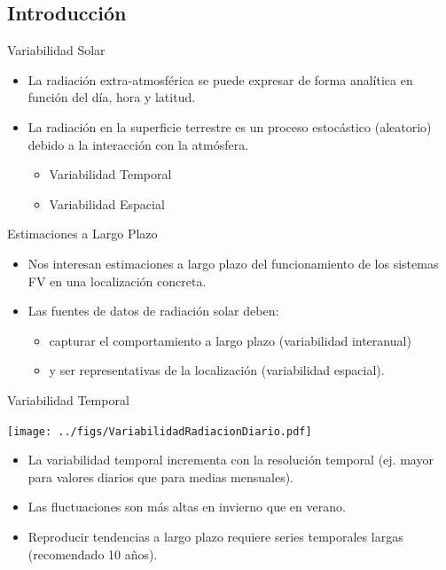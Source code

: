 \documentclass[xcolor={usenames,svgnames,dvipsnames}]{beamer}
\begin{document}
\subsection{Introducción}
\label{sec:org66394c8}
\begin{frame}[label={sec:org3919643}]{Variabilidad Solar}
\begin{itemize}
\item La \alert{radiación extra-atmosférica} se puede expresar de forma \alert{analítica} en función del día, hora y latitud.
\item La \alert{radiación en la superficie terrestre} es un \alert{proceso estocástico} (aleatorio) debido a la interacción con la atmósfera.
\begin{itemize}
\item Variabilidad Temporal
\item Variabilidad Espacial
\end{itemize}
\end{itemize}
\end{frame}
\begin{frame}[label={sec:org0550d68}]{Estimaciones a Largo Plazo}
\begin{itemize}
\item Nos interesan \alert{estimaciones a largo plazo} del funcionamiento de los sistemas FV en una localización concreta.
\item Las fuentes de datos de radiación solar deben:
\begin{itemize}
\item \alert{capturar el comportamiento a largo plazo} (variabilidad interanual)
\item y ser \alert{representativas de la localización} (variabilidad espacial).
\end{itemize}
\end{itemize}
\end{frame}

\begin{frame}[label={sec:org0943951}]{Variabilidad Temporal}
\begin{center}
\texttt{[image: ../figs/VariabilidadRadiacionDiario.pdf]}
\end{center}

\begin{itemize}
\item La variabilidad temporal \alert{incrementa con la resolución temporal} (ej. mayor para valores diarios que para medias mensuales).
\item Las fluctuaciones son \alert{más altas en invierno que en verano}.
\item Reproducir \alert{tendencias a largo plazo} requiere \alert{series temporales largas} (recomendado 10 años).
\end{itemize}
\end{frame}
\end{document}
